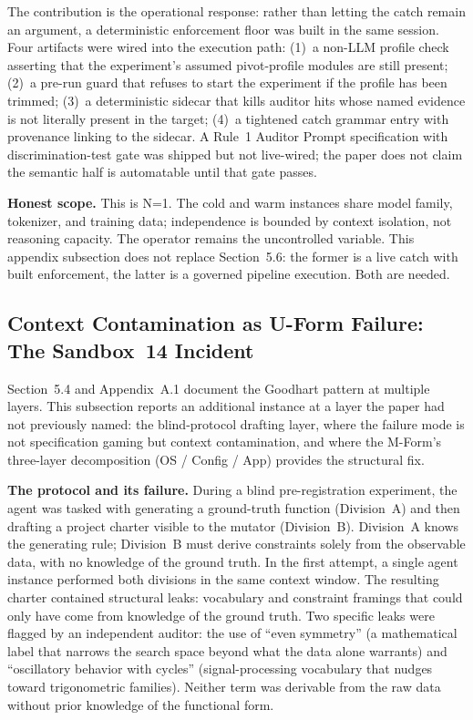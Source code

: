 \documentclass[11pt]{article}
\begin{document}
The contribution is the operational response: rather than letting the catch remain an argument, a deterministic enforcement floor was built in the same session. Four artifacts were wired into the execution path: (1)~a non-LLM profile check asserting that the experiment's assumed pivot-profile modules are still present; (2)~a pre-run guard that refuses to start the experiment if the profile has been trimmed; (3)~a deterministic sidecar that kills auditor hits whose named evidence is not literally present in the target; (4)~a tightened catch grammar entry with provenance linking to the sidecar. A Rule~1 Auditor Prompt specification with discrimination-test gate was shipped but not live-wired; the paper does not claim the semantic half is automatable until that gate passes.

\textbf{Honest scope.} This is N=1. The cold and warm instances share model family, tokenizer, and training data; independence is bounded by context isolation, not reasoning capacity. The operator remains the uncontrolled variable. This appendix subsection does not replace Section~5.6: the former is a live catch with built enforcement, the latter is a governed pipeline execution. Both are needed.

\subsection{Context Contamination as U-Form Failure: The Sandbox~14 Incident}

Section~5.4 and Appendix~A.1 document the Goodhart pattern at multiple layers. This subsection reports an additional instance at a layer the paper had not previously named: the blind-protocol drafting layer, where the failure mode is not specification gaming but context contamination, and where the M-Form's three-layer decomposition (OS / Config / App) provides the structural fix.

\textbf{The protocol and its failure.} During a blind pre-registration experiment, the agent was tasked with generating a ground-truth function (Division~A) and then drafting a project charter visible to the mutator (Division~B). Division~A knows the generating rule; Division~B must derive constraints solely from the observable data, with no knowledge of the ground truth. In the first attempt, a single agent instance performed both divisions in the same context window. The resulting charter contained structural leaks: vocabulary and constraint framings that could only have come from knowledge of the ground truth. Two specific leaks were flagged by an independent auditor: the use of ``even symmetry'' (a mathematical label that narrows the search space beyond what the data alone warrants) and ``oscillatory behavior with cycles'' (signal-processing vocabulary that nudges toward trigonometric families). Neither term was derivable from the raw data without prior knowledge of the functional form.
\end{document}
